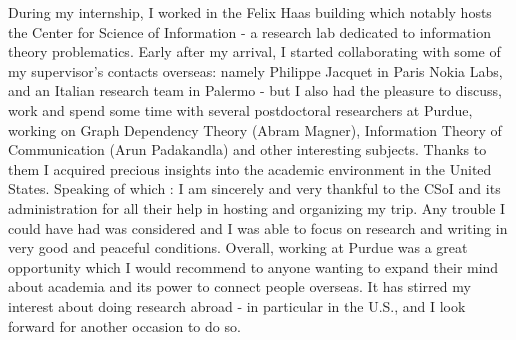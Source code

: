 During my internship, I worked in the Felix Haas building 
which notably hosts the Center for Science of Information - a research
lab dedicated to information theory problematics. 
Early after my arrival, I started collaborating with some of 
my supervisor's contacts overseas: namely Philippe Jacquet in Paris 
Nokia Labs, and an Italian research team in Palermo -
but I also had the pleasure to discuss, work and spend some time with 
several postdoctoral researchers at Purdue, 
working on Graph Dependency Theory (Abram 
Magner), Information Theory of Communication (Arun Padakandla) and 
other interesting subjects. 
Thanks to them I acquired precious insights 
into the academic environment in the United States. Speaking of which : 
I am sincerely and very thankful to the CSoI and its administration 
for all their help in hosting and organizing my trip. Any trouble 
I could have had was considered and I was able to focus on research 
and writing in very good and peaceful conditions.
Overall, working at Purdue
was a great opportunity which I would recommend to anyone wanting to expand 
their mind about academia and its power to connect people overseas.
It has stirred my interest about doing research abroad - in particular 
in the U.S., and I look forward for another occasion to do so.